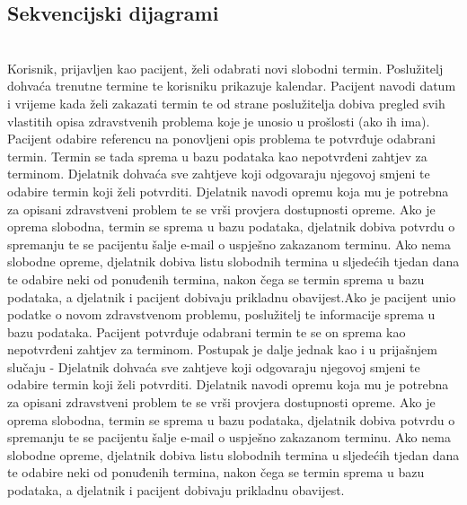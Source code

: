 \newpage
\subsection{Sekvencijski dijagrami}

\textbf{}\\

Korisnik, prijavljen kao pacijent, želi odabrati novi slobodni termin. Poslužitelj dohvaća trenutne termine te korisniku prikazuje kalendar. Pacijent navodi datum i vrijeme kada želi zakazati termin te od strane poslužitelja dobiva pregled svih vlastitih opisa zdravstvenih problema koje je unosio u prošlosti (ako ih ima). Pacijent odabire referencu na ponovljeni opis problema te potvrđuje odabrani termin. Termin se tada sprema u bazu podataka kao nepotvrđeni zahtjev za terminom. Djelatnik dohvaća sve zahtjeve koji odgovaraju njegovoj smjeni te odabire termin koji želi potvrditi. Djelatnik navodi opremu koja mu je potrebna za opisani zdravstveni problem te se vrši provjera dostupnosti opreme. Ako je oprema slobodna, termin se sprema u bazu podataka, djelatnik dobiva potvrdu o spremanju te se pacijentu šalje e-mail o uspješno zakazanom terminu. Ako nema slobodne opreme, djelatnik dobiva listu slobodnih termina u sljedećih tjedan dana te odabire neki od ponuđenih termina, nakon čega se termin sprema u bazu podataka, a djelatnik i pacijent dobivaju prikladnu obavijest.\newline Ako je pacijent unio podatke o novom zdravstvenom problemu, poslužitelj te informacije sprema u bazu podataka. Pacijent potvrđuje odabrani termin te se on sprema kao nepotvrđeni zahtjev za terminom. Postupak je dalje jednak kao i u prijašnjem slučaju - Djelatnik dohvaća sve zahtjeve koji odgovaraju njegovoj smjeni te odabire termin koji želi potvrditi. Djelatnik navodi opremu koja mu je potrebna za opisani zdravstveni problem te se vrši provjera dostupnosti opreme. Ako je oprema slobodna, termin se sprema u bazu podataka, djelatnik dobiva potvrdu o spremanju te se pacijentu šalje e-mail o uspješno zakazanom terminu. Ako nema slobodne opreme, djelatnik dobiva listu slobodnih termina u sljedećih tjedan dana te odabire neki od ponuđenih termina, nakon čega se termin sprema u bazu podataka, a djelatnik i pacijent dobivaju prikladnu obavijest.

